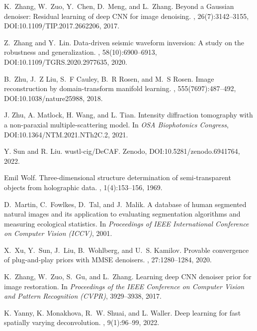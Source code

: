 \documentclass[11pt]{article}
\theoremstyle{plain} %
\begin{document}
\begin{thebibliography}{10}
K.~Zhang, W.~Zuo, Y.~Chen, D.~Meng, and L.~Zhang.
\newblock Beyond a {G}aussian denoiser: {R}esidual learning of deep {CNN} for image denoising.
, 26(7):3142--3155, 
\newblock DOI:10.1109/TIP.2017.2662206,
2017.

Z.~Zhang and Y.~Lin.
\newblock Data-driven seismic waveform inversion: A study on the robustness and generalization.
, 58(10):6900--6913,
\newblock DOI:10.1109/TGRS.2020.2977635,
2020.

B.~Zhu, J.~Z Liu, S.~F Cauley, B.~R Rosen, and M.~S Rosen.
\newblock Image reconstruction by domain-transform manifold learning.
, 555(7697):487--492,
\newblock DOI:10.1038/nature25988,
2018.

J. Zhu, A. Matlock, H. Wang, and L. Tian.
\newblock Intensity diffraction tomography with a non-paraxial multiple-scattering model.
\newblock In {\em OSA Biophotonics Congress}, 
\newblock DOI:10.1364/NTM.2021.NTh2C.2,
2021.

Y. Sun and R. Liu.
\newblock wustl-cig/DeCAF.
\newblock Zenodo,
\newblock DOI:10.5281/zenodo.6941764,
2022.

Emil Wolf.
\newblock Three-dimensional structure determination of semi-transparent objects from holographic data.
, 1(4):153--156, 
1969.

D.~Martin, C.~Fowlkes, D.~Tal, and J.~Malik.
\newblock A database of human segmented natural images and its application to evaluating segmentation algorithms and measuring ecological statistics.
\newblock In {\em Proceedings of IEEE International Conference on Computer Vision ({ICCV})}, 
2001.

X.~{Xu}, Y.~{Sun}, J.~{Liu}, B.~{Wohlberg}, and U.~S. {Kamilov}.
\newblock Provable convergence of plug-and-play priors with MMSE denoisers.
, 27:1280--1284,
2020.

K.~Zhang, W.~Zuo, S.~Gu, and L.~Zhang.
\newblock Learning deep {CNN} denoiser prior for image restoration.
\newblock In {\em Proceedings of the IEEE Conference on Computer Vision and Pattern Recognition (CVPR)}, 3929--3938, 
2017.

K. Yanny, K. Monakhova, R.~W. Shuai, and L. Waller.
\newblock Deep learning for fast spatially varying deconvolution.
, 9(1):96--99,
2022.

\end{thebibliography}
\end{document}
